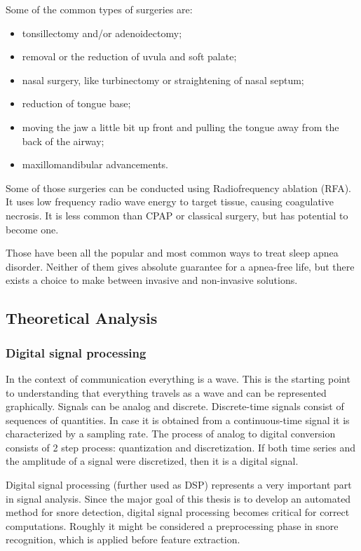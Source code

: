 Some of the common types of surgeries are:
\begin{itemize}[topsep=5pt, partopsep=0pt,itemsep=3pt,parsep=1pt]
 \item tonsillectomy and/or adenoidectomy;
 \item removal or the reduction of uvula and soft palate;
 \item nasal surgery, like turbinectomy or straightening of nasal septum;
 \item reduction of tongue base;
 \item moving the jaw a little bit up front and pulling the tongue away from the back of the airway;
 \item maxillomandibular advancements.
\end{itemize}

Some of those surgeries can be conducted using Radiofrequency ablation (RFA). It uses low frequency radio wave energy to target tissue, causing coagulative necrosis. It is less common than CPAP or classical surgery, but has potential to become one.

Those have been all the popular and most common ways to treat sleep apnea disorder. Neither of them gives absolute guarantee for a apnea-free life, but there exists a choice to make between invasive and non-invasive solutions. 

\subsection{Theoretical Analysis}
\subsubsection{Digital signal processing}\label{subsubsec:dsp}
In the context of communication everything is a wave. This is the starting point to understanding that everything travels as a wave and can be represented graphically. Signals can be analog and discrete. Discrete-time signals consist of sequences of quantities. In case it is obtained from a continuous-time signal it is characterized by a sampling rate. The process of analog to digital conversion consists of 2 step process: quantization and discretization. If both time series and the amplitude of a signal were discretized, then it is a digital signal.

Digital signal processing (further used as DSP) represents a very important part in signal analysis. Since the major goal of this thesis is to develop an automated method for snore detection, digital signal processing becomes critical for correct computations. Roughly it might be considered a preprocessing phase in snore recognition, which is applied before feature extraction. 

